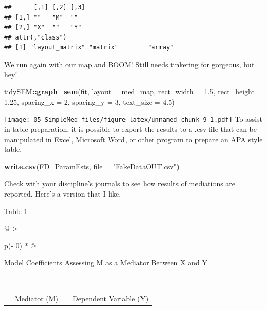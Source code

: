\documentclass[
  11pt,
]{book}
\newenvironment{Shaded}{\begin{snugshade}}{\end{snugshade}}
\newcommand{\AttributeTok}[1]{\textcolor[rgb]{0.27,0.27,0.27}{#1}}
\newcommand{\DecValTok}[1]{\textcolor[rgb]{0.06,0.06,0.06}{#1}}
\newcommand{\FloatTok}[1]{\textcolor[rgb]{0.06,0.06,0.06}{#1}}
\newcommand{\FunctionTok}[1]{\textcolor[rgb]{0.27,0.27,0.27}{\textbf{#1}}}
\newcommand{\NormalTok}[1]{#1}
\newcommand{\SpecialCharTok}[1]{\textcolor[rgb]{0.43,0.43,0.43}{\textbf{#1}}}
\newcommand{\StringTok}[1]{\textcolor[rgb]{0.5,0.5,0.5}{#1}}
\begin{document}
\begin{verbatim}
##      [,1] [,2] [,3]
## [1,] ""   "M"  ""  
## [2,] "X"  ""   "Y" 
## attr(,"class")
## [1] "layout_matrix" "matrix"        "array"
\end{verbatim}

We run again with our map and BOOM! Still needs tinkering for gorgeous, but hey!

\begin{Shaded}
\begin{Highlighting}[]
\NormalTok{tidySEM}\SpecialCharTok{::}\FunctionTok{graph\_sem}\NormalTok{(fit, }\AttributeTok{layout =}\NormalTok{ med\_map, }\AttributeTok{rect\_width =} \FloatTok{1.5}\NormalTok{, }\AttributeTok{rect\_height =} \FloatTok{1.25}\NormalTok{,}
    \AttributeTok{spacing\_x =} \DecValTok{2}\NormalTok{, }\AttributeTok{spacing\_y =} \DecValTok{3}\NormalTok{, }\AttributeTok{text\_size =} \FloatTok{4.5}\NormalTok{)}
\end{Highlighting}
\end{Shaded}

\texttt{[image: 05-SimpleMed\_files/figure-latex/unnamed-chunk-9-1.pdf]} To assist in table preparation, it is possible to export the results to a .csv file that can be manipulated in Excel, Microsoft Word, or other program to prepare an APA style table.

\begin{Shaded}
\begin{Highlighting}[]
\FunctionTok{write.csv}\NormalTok{(FD\_ParamEsts, }\AttributeTok{file =} \StringTok{"FakeDataOUT.csv"}\NormalTok{)}
\end{Highlighting}
\end{Shaded}

Check with your discipline's journals to see how results of mediations are reported. Here's a version that I like.

Table 1

\begin{longtable}[]{@{}
  >{\raggedright\arraybackslash}p{(\columnwidth - 0\tabcolsep) * }@{}}
\toprule\noalign{}
\begin{minipage}[b]{\linewidth}\raggedright
Model Coefficients Assessing M as a Mediator Between X and Y
\end{minipage} \\
\midrule\noalign{}
\endhead
\bottomrule\noalign{}
\endlastfoot
\end{longtable}

\begin{longtable}[]{@{}
  >{\raggedright\arraybackslash}p{}
  >{\centering\arraybackslash}p{}
  >{\centering\arraybackslash}p{}
  >{\centering\arraybackslash}p{}@{}}
\toprule\noalign{}
\endhead
\bottomrule\noalign{}
\endlastfoot
& Mediator (M) & & Dependent Variable (Y) \\
\end{longtable}
\end{document}
